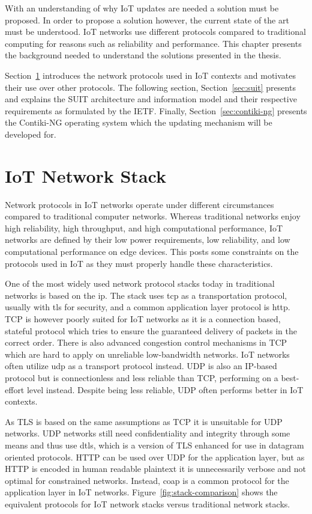 \documentclass[0-thesis.tex]{subfiles}
\begin{document}
With an understanding of why IoT updates are needed a solution must be proposed. In order
to propose a solution however, the current state of the art must be understood. IoT
networks use different protocols compared to traditional computing for reasons such as
reliability and performance. This chapter presents the background needed to understand the
solutions presented in the thesis. 

Section~\ref{sec:network} introduces the network protocols used in IoT contexts and
motivates their use over other protocols. The following section, Section~\ref{sec:suit}
presents and explains the SUIT architecture and information model and their respective
requirements as formulated by the IETF. Finally, Section~\ref{sec:contiki-ng} presents the
Contiki-NG operating system which the updating mechanism will be developed for.

\section{IoT Network Stack}
\label{sec:network}
Network protocols in IoT networks operate under different circumstances compared to
traditional computer networks. Whereas traditional networks enjoy high reliability, high
throughput, and high computational performance, IoT networks are defined by their low
power requirements, low reliability, and low computational performance on edge devices.
This posts some constraints on the protocols used in IoT as they must properly handle
these characteristics.

One of the most widely used network protocol stacks today in traditional networks is based
on the \gls{ip}. The stack uses \gls{tcp} as a transportation protocol, usually with
\gls{tls} for security, and a common application layer protocol is \gls{http}. TCP is
however poorly suited for IoT networks as it is a connection based, stateful protocol
which tries to ensure the guaranteed delivery of packets in the correct order. There is
also advanced congestion control mechanisms in TCP which are hard to apply on unreliable
low-bandwidth networks. IoT networks often utilize \gls{udp} as a transport protocol
instead. UDP is also an IP-based protocol but is connectionless and less reliable than
TCP, performing on a best-effort level instead. Despite being less reliable, UDP often
performs better in IoT contexts.

As TLS is based on the same assumptions as TCP it is unsuitable for UDP networks. UDP
networks still need confidentiality and integrity through some means and thus use
\gls{dtls}, which is a version of TLS enhanced for use in datagram oriented protocols.
HTTP can be used over UDP for the application layer, but as HTTP is encoded in human
readable plaintext it is unnecessarily verbose and not optimal for constrained networks.
Instead, \gls{coap} is a common protocol for the application layer in IoT networks.
Figure~\ref{fig:stack-comparison} shows the equivalent protocols for IoT network stacks
versus traditional network stacks. 
\end{document}
